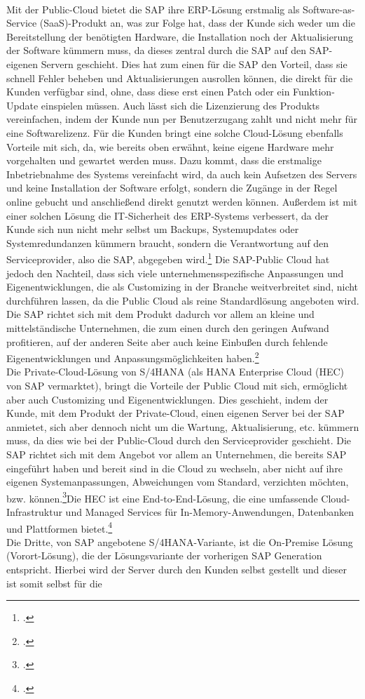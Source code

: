\\Mit der Public-Cloud bietet die SAP ihre ERP-Lösung erstmalig als Software-as-Service (SaaS)-Produkt an, was zur Folge hat, dass der Kunde sich weder um die Bereitstellung der benötigten Hardware, die Installation noch der Aktualisierung der Software kümmern muss, da dieses zentral durch die SAP auf den SAP-eigenen Servern geschieht. Dies hat zum einen für die SAP den Vorteil, dass sie schnell Fehler beheben und Aktualisierungen ausrollen können, die direkt für die Kunden verfügbar sind, ohne, dass diese erst einen Patch oder ein Funktion-Update einspielen müssen. Auch lässt sich die Lizenzierung des Produkts vereinfachen, indem der Kunde nun per Benutzerzugang zahlt und nicht mehr für eine Softwarelizenz. Für die Kunden bringt eine solche Cloud-Lösung ebenfalls Vorteile mit sich, da, wie bereits oben erwähnt, keine eigene Hardware mehr vorgehalten und gewartet werden muss. Dazu kommt, dass die erstmalige Inbetriebnahme des Systems vereinfacht wird, da auch kein Aufsetzen des Servers und keine Installation der Software erfolgt, sondern die Zugänge in der Regel online gebucht und anschließend direkt genutzt werden können. Außerdem ist mit einer solchen Lösung die IT-Sicherheit des ERP-Systems verbessert, da der Kunde sich nun nicht mehr selbst um Backups, Systemupdates oder Systemredundanzen kümmern braucht, sondern die Verantwortung auf den Serviceprovider, also die SAP, abgegeben wird.\footcite[Vgl.][]{saas} Die SAP-Public Cloud hat jedoch den Nachteil, dass sich viele unternehmensspezifische Anpassungen und Eigenentwicklungen, die als \glqq{}Customizing\grqq{} in der Branche weitverbreitet sind, nicht durchführen lassen, da die Public Cloud als reine Standardlösung angeboten wird. Die SAP richtet sich mit dem Produkt dadurch vor allem an kleine und mittelständische Unternehmen, die zum einen durch den geringen Aufwand profitieren, auf der anderen Seite aber auch keine Einbußen durch fehlende Eigenentwicklungen und Anpassungsmöglichkeiten haben.\footcite[Vgl.][]{rz10-s4hana}\\Die Private-Cloud-Lösung von S/4HANA (als \glqq{}HANA Enterprise Cloud (HEC)\grqq{} von SAP vermarktet), bringt die Vorteile der Public Cloud mit sich, ermöglicht aber auch Customizing und Eigenentwicklungen. Dies geschieht, indem der Kunde, mit dem Produkt der Private-Cloud, einen eigenen Server bei der SAP anmietet, sich aber dennoch nicht um die Wartung, Aktualisierung, etc. kümmern muss, da dies wie bei der Public-Cloud durch den Serviceprovider geschieht. Die SAP richtet sich mit dem Angebot vor allem an Unternehmen, die bereits SAP eingeführt haben und bereit sind in die Cloud zu wechseln, aber nicht auf ihre eigenen Systemanpassungen, Abweichungen vom Standard, verzichten möchten, bzw. können.\footcite[Vgl.][]{rz10-hana}\glqq{}Die HEC ist eine End-to-End-Lösung, die eine umfassende Cloud-Infrastruktur und Managed Services für In-Memory-Anwendungen, Datenbanken und Plattformen bietet.\grqq{}\footcite[Vgl.][]{rz10-hana}\\Die Dritte, von SAP angebotene S/4HANA-Variante, ist die On-Premise Lösung (Vorort-Lösung), die der Lösungsvariante der vorherigen SAP Generation entspricht. Hierbei wird der Server durch den Kunden selbst gestellt und dieser ist somit selbst für die 